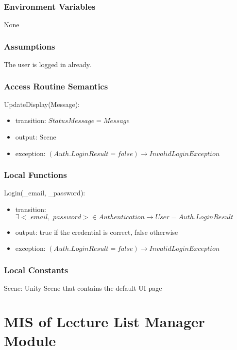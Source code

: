\documentclass[12pt, titlepage]{article}
\begin{document}
\subsubsection{Environment Variables}

None

\subsubsection{Assumptions}

The user is logged in already.

\subsubsection{Access Routine Semantics}

\noindent UpdateDisplay(Message):
\begin{itemize}
\item transition: $StatusMessage = Message$ 
\item output: Scene
\item exception: $(Auth.LoginResult = false) \rightarrow InvalidLoginException$
\end{itemize}

\subsubsection{Local Functions}

\noindent Login(\_email, \_password):
\begin{itemize}
\item transition: $\exists <\_email, \_password> \in Authentication \rightarrow User = Auth.LoginResult$ 
\item output: true if the credential is correct, false otherwise
\item exception: $(Auth.LoginResult = false) \rightarrow InvalidLoginException$
\end{itemize}

\subsubsection{Local Constants}

Scene: Unity Scene that contains the default UI page

\newpage

\section{MIS of Lecture List Manager Module} \label{mLL}
\end{document}
